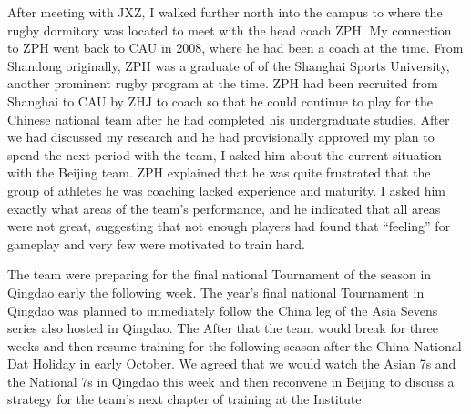 

After meeting with JXZ, I walked further north into the campus to where the rugby dormitory was located to meet with the head coach ZPH. My connection to ZPH went back to CAU in 2008, where he had been a coach at the time. From Shandong originally, ZPH was a graduate of of the Shanghai Sports University, another prominent rugby program at the time.  ZPH had been recruited from Shanghai to CAU by ZHJ to coach so that he could continue to play for the Chinese national team after he had completed his undergraduate studies.  After we had discussed my research and he had provisionally approved my plan to spend the next period with the team, I asked him about the current situation with the Beijing team.  ZPH explained that he was quite frustrated that the group of athletes he was coaching lacked experience and maturity. I asked him exactly what areas of the team's performance, and he indicated that all areas were not great, suggesting that not enough players had found that ``feeling'' for gameplay and very few were motivated to train hard.

The team were preparing for the final national Tournament of the season in Qingdao early the following week. The year's final national Tournament in Qingdao was planned to immediately follow the China leg of the Asia Sevens series also hosted in Qingdao. The After that the team would break for three weeks and then resume training for the following season after the China National Dat Holiday in early October.  We agreed that we would watch the Asian 7s and the National 7s in Qingdao this week and then reconvene in Beijing to discuss a strategy for the team's next chapter of training at the Institute.
